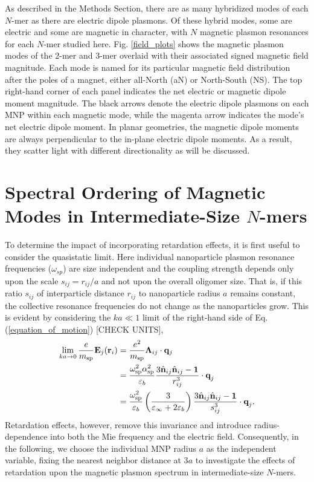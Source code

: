 \documentclass[journal=apchd5,manuscript=article]{achemso}
\begin{document}
As described in the Methods Section, there are as many hybridized modes of each $N$-mer as there are electric dipole plasmons. Of these hybrid modes, some are electric and some are magnetic in character, with $N$ magnetic plasmon resonances for each $N$-mer studied here. Fig. \ref{field_plots} shows the magnetic plasmon modes of the 2-mer and 3-mer overlaid with their associated signed magnetic field magnitude. Each mode is named for its particular magnetic field distribution after the poles of a magnet, either all-North (aN) or North-South (NS). The top right-hand corner of each panel indicates the net electric or magnetic dipole moment magnitude. The black arrows denote the electric dipole plasmons on each MNP within each magnetic mode, while the magenta arrow indicates the mode's net electric dipole moment. In planar geometries, the magnetic dipole moments are always perpendicular to the in-plane electric dipole moments. As a result, they scatter light with different directionality as will be discussed.




\section{Spectral Ordering of Magnetic Modes in Intermediate-Size $N$-mers}
To determine the impact of incorporating retardation effects, it is first useful to consider the quasistatic limit. Here individual nanoparticle plasmon resonance frequencies ($\omega_{sp}$) are size independent and the coupling strength depends only upon the scale $s_{ij} = r_{ij}/a$ and not upon the overall oligomer size. That is, if this ratio $s_{ij}$ of interparticle distance $r_{ij}$ to nanoparticle radius $a$ remains constant, the collective resonance frequencies do not change as the nanoparticles grow. This is evident by considering the $ka\ll 1$ limit of the right-hand side of Eq. (\ref{equation_of_motion}) [CHECK UNITS],
\begin{equation}
\begin{aligned}
\lim_{ka \to 0}\frac{e}{m_{\textrm{sp}}}\textbf{E}_j(\textbf{r}_i) &= \frac{e^2}{m_{\textrm{sp}}}\boldsymbol{\Lambda}_{ij}\cdot{\bf q}_j\\ 
&= \frac{\omega_{\textrm{sp}}^2 \alpha_{\textrm{sp}}^2}{\varepsilon_b}\frac{3\hat{\textbf{n}}_{ij}\hat{\textbf{n}}_{ij} - \textbf{1}}{r_{ij}^3} \cdot \textbf{q}_j \\
&= \frac{\omega_{\textrm{sp}}^2}{\varepsilon_b} \left(\frac{3}{\varepsilon_{\infty}+2\varepsilon_b}\right)\frac{3\hat{\textbf{n}}_{ij}\hat{\textbf{n}}_{ij} - \textbf{1}}{s_{ij}^3} \cdot \textbf{q}_j.
\end{aligned}
\label{quasistatic_coupling}
\end{equation}
Retardation effects, however, remove this invariance and introduce radius-dependence into both the Mie frequency and the electric field. Consequently, in the following, we choose the individual MNP radius $a$ as the independent variable, fixing the nearest neighbor distance at 3$a$ to investigate the effects of retardation upon the magnetic plasmon spectrum in intermediate-size $N$-mers.
\end{document}
